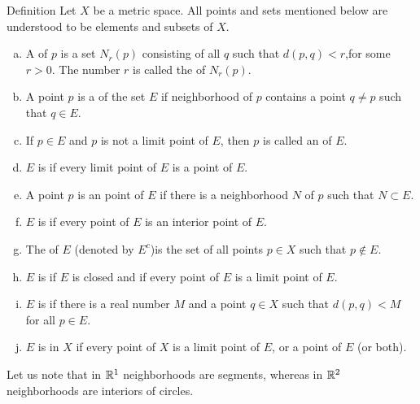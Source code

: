 \begin{mydef}\label{mydef:2.18}
    Definition Let $X$ be a metric space. All points and sets mentioned below are understood to be elements and subsets of $X$.
    \begin{enumerate}[(a)]
        \item A  of $p$ is a set $N_r(p)$ consisting of all $q$ such that $d(p, q) < r$,for some $r > 0$. The number $r$ is called the  of $N_r(p)$.
        \item A point $p$ is a  of the set $E$ if  neighborhood of $p$ contains a point $q \neq p$ such that $q \in E$.
        \item If $p \in E$ and $p$ is not a limit point of $E$, then $p$ is called an  of $E$.
        \item $E$ is  if every limit point of $E$ is a point of $E$.
        \item A point $p$ is an  point of $E$ if there is a neighborhood $N$ of $p$ such that $N \subset E$.
        \item $E$ is  if every point of $E$ is an interior point of $E$.
        \item The  of $E$ (denoted by $E^c$)is the set of all points $p \in X$ such that $p \not\in E$.
        \item $E$ is  if $E$ is closed and if every point of $E$ is a limit point of $E$.
        \item $E$ is  if there is a real number $M$ and a point $q \in X$ such that $d(p,q)< M$ for all $p \in E$.
        \item $E$ is  in $X$ if every point of $X$ is a limit point of $E$, or a point of $E$ (or both).
    \end{enumerate}
\end{mydef}

Let us note that in ${\protect\mathbb R}^1$ neighborhoods are segments, whereas in ${\protect\mathbb R}^2$ neighborhoods are interiors of circles.


